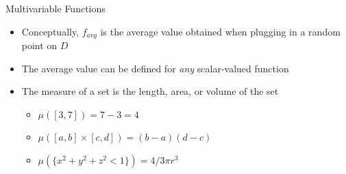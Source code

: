 \documentclass[10pt]{beamer}
\begin{document}
\begin{frame}{Multivariable Functions}
    \begin{itemize}
        \vspace{3mm}
        \item Conceptually, $f_{avg}$ is the average value obtained when plugging in a random point on $D$
        \item The average value can be defined for \textit{any} scalar-valued function
        \item The measure of a set is the length, area, or volume of the set
        \begin{itemize}
            \item $\mu( [3,7])= 7-3=4$
            \item $\mu( [a,b]\times[c,d] ) = (b-a)(d-c)$
            \item $\mu( \{x^2 + y^2 +z^2 < 1\} ) = 4/3 \pi r^3$
        \end{itemize}
    \end{itemize}
\end{frame}

\end{document}
